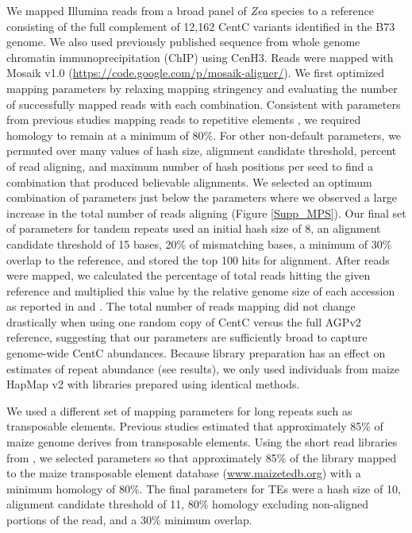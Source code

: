 We mapped Illumina reads from a broad panel of \emph{Zea} species \citep{Chia2012,Tenaillon2011}  to a reference consisting of the full complement of 12,162 CentC variants identified in the B73 genome.  
We also used previously published sequence from whole genome chromatin immunoprecipitation (ChIP) \citep{Wolfgruber2009, Wang2013} using CenH3.  Reads were mapped with  Mosaik v1.0 (\url{https://code.google.com/p/mosaik-aligner/}). 
We first optimized mapping parameters by relaxing mapping stringency and evaluating the number of successfully mapped reads with each combination.  
Consistent with parameters from previous studies mapping reads to repetitive elements \citep{Tenaillon2011}, we required homology to remain at a minimum of 80\%.  
For other non-default parameters, we permuted over many values of hash size, alignment candidate threshold,  percent of read aligning, and maximum number of hash positions per seed to find a combination that produced believable alignments.  
We selected an optimum combination of parameters just below the parameters where we observed a large increase in the total number of reads aligning (Figure \ref{Supp_MPS}).
Our final set of parameters for tandem repeats used an initial hash size of 8, an alignment candidate threshold of 15 bases, 20\% of mismatching bases, a minimum of 30\% overlap to the reference, and stored the top 100 hits for alignment.  
After reads were mapped, we calculated the percentage of total reads hitting the given reference and multiplied this value by the relative genome size of each accession as reported in \citet{Chia2012} and \citet{Tenaillon2011}. 
The total number of reads mapping did not change drastically when using one random copy of CentC versus the full AGPv2 reference, suggesting that our parameters are sufficiently broad to capture genome-wide CentC abundances.  
Because library preparation has an effect on estimates of repeat abundance (see results), we only used individuals from maize HapMap v2 \citep{Chia2012} with libraries prepared using identical methods.
	
We used a different set of mapping parameters for long repeats such as transposable elements.  
Previous studies \citep{Schnable2009} estimated that approximately 85\% of maize genome derives from transposable elements.  
Using the short read libraries from \citet{Tenaillon2011}, we selected parameters so that approximately 85\% of the library mapped to the maize transposable element database (\url{www.maizetedb.org}) with a minimum homology of 80\%.  
The final parameters for TEs were a hash size of 10, alignment candidate threshold of 11, 80\% homology excluding non-aligned portions of the read, and a 30\% minimum overlap.

